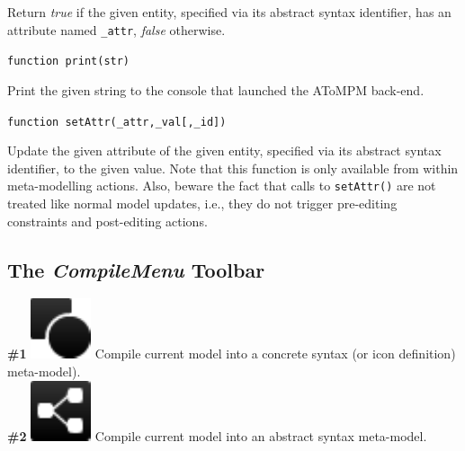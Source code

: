 \documentclass{article}
\numberwithin{equation}{section}
\numberwithin{figure}{section}
\begin{document}
Return \textit{true} if the given entity, specified via its abstract syntax identifier, has an attribute named \texttt{\_attr}, \textit{false} otherwise.\\
\vspace*{1em}


\begin{center}	{\large \texttt{function print(str)}} \end{center}

Print the given string to the console that launched the AToMPM back-end.\\
\vspace*{1em}


\begin{center}	{\large \texttt{function setAttr(\_attr,\_val[,\_id])}} \end{center}

Update the given attribute of the given entity, specified via its abstract syntax identifier, to the given value. Note that this function is only available from within meta-modelling actions. Also, beware the fact that calls to \texttt{setAttr()} are not treated like normal model updates, i.e., they do not trigger pre-editing constraints and post-editing actions.



\subsection{The \textit{CompileMenu} Toolbar}
\label{ssec:compiletb}
\textbf{\#1} \hspace*{1cm}
\includegraphics[scale=0.5]{figures/icon_compileToCSMM} \hspace*{1cm}
Compile current model into a concrete syntax (or icon definition) meta-model).\\

\textbf{\#2} \hspace*{1cm}
\includegraphics[scale=0.5]{figures/icon_compileToASMM} \hspace*{1cm}
Compile current model into an abstract syntax meta-model.\\
\end{document}
